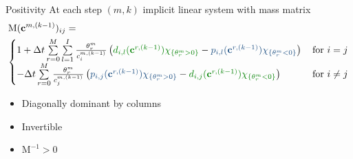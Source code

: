 \documentclass[aspectratio=169]{beamer}
\newcommand{\1}{\begin{pmatrix}
                 1\\
                 1
                \end{pmatrix}}
\def\bbc{\underline{\mathbf{c}}}
\def\bc{\mathbf{c}}
\def\M{\mathrm{M}}
\begin{document}
\begin{frame}{Positivity}
At each step $(m,k)$ implicit linear system with mass matrix 
\begin{equation*}\label{eq:mass_matrix}
\begin{split}
&\M(\bc^{m,(k-1)})_{ij}= \\
&\!\begin{cases}
1+\Delta t \sum\limits_{r=0}^M \sum\limits_{l=1}^I  \frac{\theta_r^m}{c_i^{m,(k-1)}}   \left( {\color{lightgreen} d_{i,l}(\bc^{r,(k-1)})  \chi_{\lbrace \theta^m_r>0\rbrace}}  -{\color{lightblue} p_{i,l} (\bc^{r,(k-1)})\chi_{\lbrace \theta^m_r<0 \rbrace}} \right)  \,&\text{for }i=j\\
-\Delta t \sum\limits_{r=0}^M \frac{\theta_r^m}{c_j^{m,(k-1)}} \left({\color{lightblue}  p_{i,j}(\bc^{r,(k-1)})\chi_{\lbrace \theta^m_r>0\rbrace}} -{\color{lightgreen} d_{i,j} (\bc^{r,(k-1)})\chi_{\lbrace \theta^m_r<0\rbrace}} \right)  \, &\text{for }i\ne j
\end{cases}
\end{split}
\end{equation*}

\begin{itemize}
\item Diagonally dominant by columns
\item Invertible
\item $\M^{-1}>0$
\end{itemize}

\end{frame}

%
\end{document}
